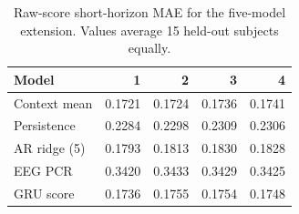 \begin{table}[!ht]
\centering
\small
\setlength{\tabcolsep}{5pt}
\renewcommand{\arraystretch}{1.1}
\caption{Raw-score short-horizon MAE for the five-model extension. Values average 15 held-out subjects equally.}
\label{tab:supp_short_mae_raw}
\begin{tabular}{lrrrr}
\toprule
Model & 1 & 2 & 3 & 4 \\
\midrule
Context mean & 0.1721 & 0.1724 & 0.1736 & 0.1741 \\
Persistence & 0.2284 & 0.2298 & 0.2309 & 0.2306 \\
AR ridge (5) & 0.1793 & 0.1813 & 0.1830 & 0.1828 \\
EEG PCR & 0.3420 & 0.3433 & 0.3429 & 0.3425 \\
GRU score & 0.1736 & 0.1755 & 0.1754 & 0.1748 \\
\bottomrule
\end{tabular}
\end{table}
